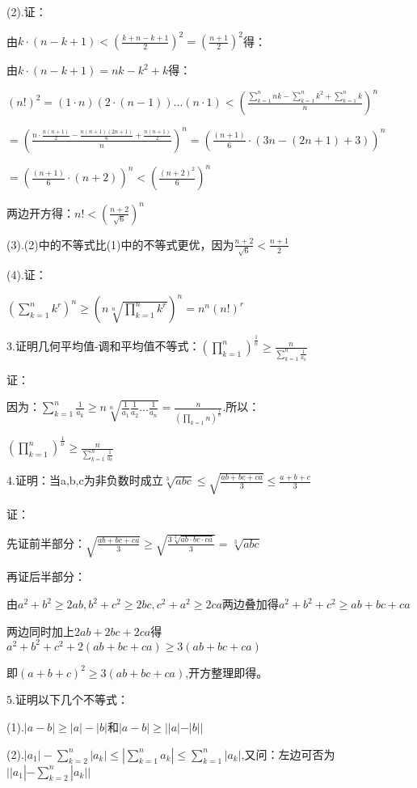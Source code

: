 \documentclass[12pt]{ctexart}
\begin{document}
(2).证：


由$k\cdot{(n-k+1)}<(\frac{k+n-k+1}{2})^2=(\frac{n+1}{2})^2$得：

由$k\cdot{(n-k+1)}=nk-k^2+k$得：

$(n!)^2=(1\cdot n)(2\cdot (n-1))...(n\cdot1)<(\frac{\sum\limits_{k=1}^nnk-\sum\limits_{k=1}^{n}k^2+\sum\limits_{k=1}^nk}{n})^n$

$=(\frac{n\cdot{\frac{n(n+1)}{2}}-\frac{n(n+1)(2n+1)}{6}+\frac{n(n+1)}{2}}{n})^n=(\frac{(n+1)}{6}\cdot{(3n-(2n+1)+3)})^n$

$=(\frac{(n+1)}{6}\cdot{(n+2)})^n<(\frac{(n+2)^2}{6})^n$

两边开方得：$n!<(\frac{n+2}{\sqrt{6}})^n$

(3).(2)中的不等式比(1)中的不等式更优，因为$\frac{n+2}{\sqrt{6}}<\frac{n+1}{2}$

(4).证：

$(\sum\limits_{k=1}^nk^r)^n\ge{(n\sqrt[n]{\prod\limits_{k=1}^nk^r})^n}=n^n(n!)^r$

3.证明几何平均值-调和平均值不等式：$(\prod\limits_{k=1}^n)^{\frac{1}{n}}\ge{\frac{n}{\sum\limits_{k=1}^n{\frac{1}{a_k}}}}$

证：

因为：$\sum\limits_{k=1}^n{\frac{1}{a_k}}\ge{n\sqrt[n]{\frac{1}{a_1}\frac{1}{a_2}...\frac{1}{a_n}}}=\frac{n}{({\prod\limits_{k=1}{n}})^{\frac{1}{n}}}$.所以：

$(\prod\limits_{k=1}^n)^{\frac{1}{n}}\ge{\frac{n}{\sum\limits_{k=1}^n{\frac{1}{a_k}}}}$

4.证明：当a,b,c为非负数时成立$\sqrt[3]{abc}\le{\sqrt{\frac{ab+bc+ca}{3}}}\le\frac{a+b+c}{3}$

证：

先证前半部分：${\sqrt{\frac{ab+bc+ca}{3}}}\ge{{\sqrt{\frac{3\sqrt[3]{ab\cdot{bc}\cdot{ca}}}{3}}}}=\sqrt[3]{abc}$

再证后半部分：

由$a^2+b^2\ge{2ab},b^2+c^2\ge{2bc},c^2+a^2\ge{2ca}$两边叠加得$a^2+b^2+c^2\ge{ab+bc+ca}$

两边同时加上$2ab+2bc+2ca$得$a^2+b^2+c^2 +2(ab+bc+ca)\ge{3(ab+bc+ca)}$

即$(a+b+c)^2\ge{3(ab+bc+ca)}$,开方整理即得。

5.证明以下几个不等式：

(1).$|a-b|\ge|a|-|b|$和$|a-b|\ge||a|-|b||$

(2).$|a_1|-\sum\limits_{k=2}^n|a_k|\le{|\sum\limits_{k=1}^na_k|}\le{\sum\limits_{k=1}^n|a_k|}$,又问：左边可否为$||a_1|-\sum\limits_{k=2}^n|a_k||$
\end{document}

